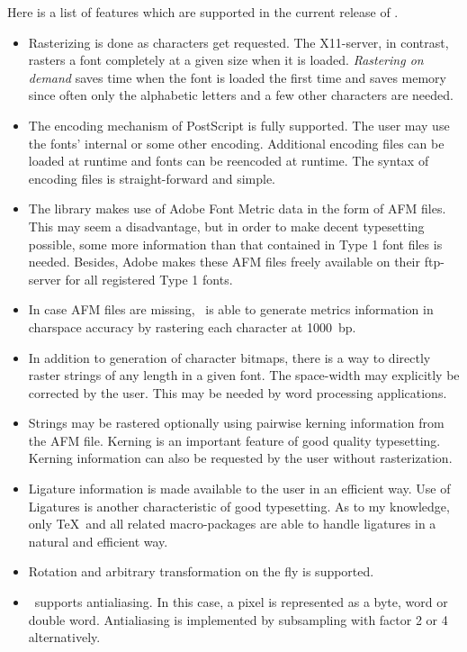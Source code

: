 Here is a list of features which are supported in the current release
of \tonelib.
\begin{itemize}
\item Rasterizing is done as characters get requested. The X11-server,
  in contrast,
  rasters a font completely at a given size
  when it is loaded. {\em Rastering on demand} saves time when the
  font is loaded the first time and saves memory since often only the
  alphabetic letters and a few other characters are needed.
\item The encoding mechanism of PostScript is fully supported. The
  user may use the fonts' internal or some other encoding.
  Additional encoding files can be loaded at runtime and fonts can be
  reencoded at runtime. The syntax of encoding files is
  straight-forward and simple.
\item The library makes use of Adobe Font Metric data in the form of
  AFM files. This may seem a disadvantage, but in order
  to make decent typesetting possible, some more information than that
  contained in Type 1 font files is needed. Besides, Adobe makes
  these AFM files freely available on their ftp-server for all
  registered Type 1 fonts.
\item In case AFM files are missing, \tonelib\ is able to generate
  metrics information in charspace accuracy by rastering each
  character at 1000~bp.
\item In addition to generation of character bitmaps, there is a way
  to directly raster strings of any length in a given font. 
  The space-width may explicitly be corrected by the user. This
  may be needed by word processing applications.
\item Strings may be rastered 
  optionally using pairwise kerning information from
  the AFM file. Kerning is an important feature of good
  quality typesetting.
  Kerning information can also be requested by the user without
  rasterization. 
\item Ligature information is made available to the user in an
  efficient way. Use of Ligatures is another characteristic of good
  typesetting. As to my 
  knowledge, only \TeX\ and all related macro-packages are able to
  handle ligatures in a natural and efficient way. 
\item Rotation and arbitrary transformation on the fly is supported. 
\item \tonelib\ supports antialiasing. In this case, a pixel is
  represented as a byte, word or double word. Antialiasing is
  implemented by subsampling with factor 2 or 4 alternatively.

\end{itemize}
